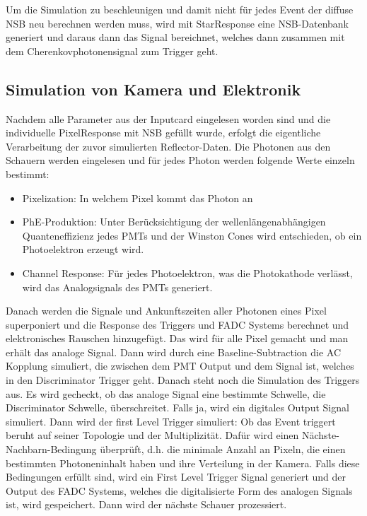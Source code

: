 Um die Simulation zu beschleunigen und damit nicht für jedes Event der diffuse NSB neu berechnen werden muss, wird mit StarResponse eine NSB-Datenbank generiert und daraus dann das Signal bereichnet, welches dann zusammen mit dem Cherenkovphotonensignal zum Trigger geht.

\subsection{Simulation von Kamera und Elektronik}
Nachdem alle Parameter aus der Inputcard eingelesen worden sind und die individuelle PixelResponse mit NSB gefüllt wurde, erfolgt die eigentliche Verarbeitung der zuvor simulierten Reflector-Daten.
Die Photonen aus den Schauern werden eingelesen und für jedes Photon werden folgende Werte einzeln bestimmt:

\begin{itemize}
 \item Pixelization: In welchem Pixel kommt das Photon an
 \item PhE-Produktion: Unter Berücksichtigung der wellenlängenabhängigen Quanteneffizienz jedes PMTs und der Winston Cones wird entschieden, ob ein Photoelektron erzeugt wird.
 \item Channel Response: Für jedes Photoelektron, was die Photokathode verlässt, wird das Analogsignals des PMTs generiert.
\end{itemize}

Danach werden die Signale und Ankunftszeiten aller Photonen eines Pixel superponiert und die Response des Triggers und FADC Systems berechnet und elektronisches Rauschen hinzugefügt.
Das wird für alle Pixel gemacht und man erhält das analoge Signal.
Dann wird durch eine Baseline-Subtraction die AC Kopplung simuliert, die zwischen dem PMT Output und dem Signal ist, welches in den Discriminator Trigger geht.
Danach steht noch die Simulation des Triggers aus. 
Es wird gecheckt, ob das analoge Signal eine bestimmte Schwelle, die Discriminator Schwelle, überschreitet.
Falls ja, wird ein digitales Output Signal simuliert.
Dann wird der first Level Trigger simuliert:
Ob das Event triggert beruht auf seiner Topologie und der Multiplizität.
Dafür wird einen Nächste-Nachbarn-Bedingung überprüft, d.h. die minimale Anzahl an Pixeln, die einen bestimmten Photoneninhalt haben und ihre Verteilung in der Kamera.
Falls diese Bedingungen erfüllt sind, wird ein First Level Trigger Signal generiert und der Output des FADC Systems, welches die digitalisierte Form des analogen Signals ist, wird gespeichert.
Dann wird der nächste Schauer prozessiert.

